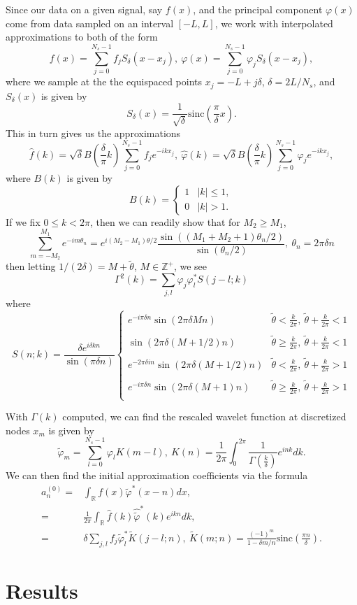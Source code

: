 \documentclass[a4paper,11pt]{article}
\newcommand{\ba}{\begin{array}}
\newcommand{\ea}{\end{array}}
\begin{document}
Since our data on a given signal, say $f(x)$, and the principal component $\varphi(x)$ come from data sampled on an interval $[-L,L]$, we work with interpolated approximations to both of the form
\[
f(x) = \sum_{j=0}^{N_{s}-1}f_{j}S_{\delta}(x-x_{j}), ~ \varphi(x) = \sum_{j=0}^{N_{s}-1} \varphi_{j}S_{\delta}(x-x_{j}), 
\]
where we sample at the the equispaced points $x_{j} = -L+j\delta $, $\delta = 2L/N_{s}$, and $S_{\delta }(x)$ is given by 
\[
S_{\delta}(x) = \frac{1}{\sqrt{\delta}}\mbox{sinc}\left(\frac{\pi}{\delta} x\right).
\]
This in turn gives us the approximations 
\[
\hat{f}(k) = \sqrt{\delta} B\left(\frac{\delta}{\pi} k\right)\sum_{j=0}^{N_{s}-1}f_{j}e^{-ikx_{j}}, ~ \hat{\varphi}(k) = \sqrt{\delta} B\left(\frac{\delta}{\pi} k\right)\sum_{j=0}^{N_{s}-1}\varphi_{j}e^{-ikx_{j}},
\]
where $B(k)$ is given by 
\[
B(k) = \left\{
\ba{rl}
1 & |k| \leq 1, \\ 
0 & |k| > 1.
\ea
\right.
\]
If we fix $0\leq k < 2\pi$, then we can readily show that for $M_{2}\geq M_{1}$,
\[
\sum_{m=-M_{2}}^{M_{1}}e^{-im\theta_{n}} = e^{i(M_{2}-M_{1})\theta/2}\frac{\sin\left((M_{1}+M_{2}+1)\theta_{n}/2\right)}{\sin\left(\theta_{n}/2\right)}, ~ \theta_{n} = 2\pi \delta n
\]
then letting $1/(2\delta) = M + \tilde{\theta}$, $M\in\mathbb{Z}^{+}$, we see 
\[
\Gamma^{2}(k) = \sum_{j,l}\varphi_{j}\varphi^{\ast}_{l}S(j-l;k)
\]
where
\[
S(n;k) = \frac{\delta e^{i \delta k n}}{\sin\left(\pi \delta n\right)}\left\{\begin{array}{rl} e^{-i \pi \delta n}\sin\left(2\pi \delta Mn\right) & \tilde{\theta} < \frac{k}{2\pi}, ~ \tilde{\theta} + \frac{k}{2\pi} < 1 \\ 
&\\
\sin\left(2\pi \delta (M+1/2)n\right) & \tilde{\theta} \geq \frac{k}{2\pi}, ~ \tilde{\theta} + \frac{k}{2\pi} < 1 \\
& \\
e^{-2\pi \delta i n} \sin\left(2\pi \delta (M+1/2) n\right) & \tilde{\theta} < \frac{k}{2\pi}, ~ \tilde{\theta} + \frac{k}{2\pi} > 1 \\
& \\ 
e^{-i\pi \delta n} \sin\left(2\pi \delta (M+1) n\right) & \tilde{\theta} \geq \frac{k}{2\pi}, ~ \tilde{\theta} + \frac{k}{2\pi} > 1 \\
\end{array}\right.
\]

With $\Gamma(k)$ computed, we can find the rescaled wavelet function at discretized nodes $x_{m}$ is given by 
\[
\tilde{\varphi}_{m} = \sum_{l=0}^{N_{s}-1}\varphi_{l}K(m-l), ~ K(n) = \frac{1}{2\pi}\int_{0}^{2\pi} \frac{1}{\Gamma\left(\frac{k}{\delta}\right)}e^{ink}dk.
\]
We can then find the initial approximation coefficients via the formula
\begin{align*}
a^{(0)}_{n} = & \int_{\mathbb{R}}f(x)\tilde{\varphi}^{\ast}(x-n)dx, \\
= & \frac{1}{2\pi}\int_{\mathbb{R}}\hat{f}(k) \hat{\tilde{\varphi}}^{\ast}(k)e^{ikn}dk,\\
= & \delta \sum_{j,l}f_{j}\tilde{\varphi}^{\ast}_{l}\tilde{K}(j-l;n), ~ \tilde{K}(m;n) = \frac{(-1)^{m}}{1-\delta m/n}\mbox{sinc}\left(\frac{\pi n}{\delta}\right).
\end{align*}
\section*{Results}
\end{document}
